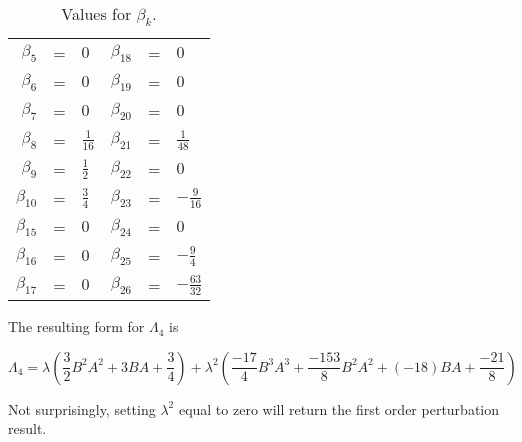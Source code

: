\documentclass{article}
\begin{document}
\begin{table}[!hp]
\begin{center}
\begin{tabular}{rclrcl}
 $\beta_{5}$  & = & $ 0            $        & $\beta_{18}$ & = & $ 0              $ \\
 $\beta_{6}$  & = & $ 0            $        & $\beta_{19}$ & = & $ 0              $ \\
 $\beta_{7}$  & = & $ 0            $        & $\beta_{20}$ & = & $ 0              $ \\
 $\beta_{8}$  & = & $ \frac{1}{16} $        & $\beta_{21}$ & = & $ \frac{1}{48}   $ \\
 $\beta_{9}$  & = & $ \frac{1}{2}  $        & $\beta_{22}$ & = & $ 0              $ \\
 $\beta_{10}$ & = & $ \frac{3}{4}  $        & $\beta_{23}$ & = & $ -\frac{9}{16}  $ \\
 $\beta_{15}$ & = & $ 0            $        & $\beta_{24}$ & = & $ 0              $ \\
 $\beta_{16}$ & = & $ 0            $        & $\beta_{25}$ & = & $ -\frac{9}{4}   $ \\
 $\beta_{17}$ & = & $ 0            $        & $\beta_{26}$ & = & $ -\frac{63}{32} $ \\
\end{tabular}
\caption{Values for $\beta_{k}$. \label{tabSolvedBetaValues}}
\end{center}
\end{table}

The resulting form for $\Lambda_{4}$ is

\begin{equation}
\Lambda_{4} = \lambda(\frac{3}{2}B^{2}A^{2}+3BA+\frac{3}{4})+\lambda^{2}(\frac{-17}{4}B^{3}A^{3}+\frac{-153}{8}B^{2}A^{2}+(-18)BA+\frac{-21}{8})
\end{equation}

Not surprisingly, setting $\lambda^{2}$ equal to zero will return the first order perturbation result.
\end{document}
